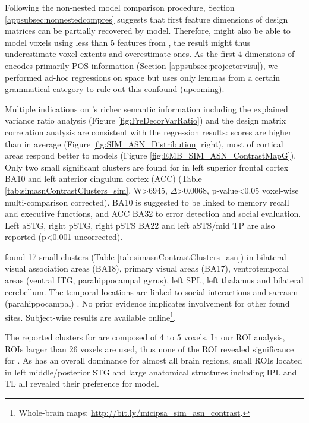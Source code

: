 Following the non-nested model comparison procedure, Section \ref{appsubsec:nonnestedcompres} suggests that first feature dimensions of  design matrices can be partially recovered by  model. Therefore,  might also be able to model voxels using less than 5 features from , the result might thus underestimate  voxel extents and overestimate  ones. As the first 4 dimensions of  encodes primarily POS information (Section \ref{appsubsec:projectorvisu}), we performed ad-hoc regressions on  space but uses only lemmas from a certain grammatical category to rule out this confound (upcoming). 

Multiple indications on 's richer semantic information including the explained variance ratio analysis (Figure \ref{fig:FreDecorVarRatio}) and the design matrix correlation analysis are consistent with the regression results:  scores are higher than  in average (Figure \ref{fig:SIM_ASN_Distribution} right), most of cortical areas respond better to  models (Figure \ref{fig:EMB_SIM_ASN_ContrastMapG}). Only two small significant clusters are found for  in left superior frontal cortex BA10 and left anterior cingulum cortex (ACC) (Table \ref{tab:simasnContrastClusters_sim}, W>6945, \(\Delta\)>0.0068, p-value<0.05 voxel-wise multi-comparison corrected). BA10 is suggested to be linked to memory recall and executive functions, and ACC BA32 to error detection and social evaluation. Left aSTG, right pSTG, right pSTS BA22 and left aSTS/mid TP are also reported (p<0.001 uncorrected). 

 found 17 small clusters  (Table \ref{tab:simasnContrastClusters_asn}) in bilateral visual association areas (BA18), primary visual areas (BA17), ventrotemporal areas (ventral ITG, parahippocampal gyrus), left SPL, left thalamus and bilateral cerebellum. The temporal locations are linked to social interactions and sarcasm (parahippocampal) \parencite{rankinDetectingSarcasmParalinguistic2009}. No prior evidence implicates \similarity involvement for other found sites. Subject-wise results are available online\footnote{Whole-brain maps: \url{http://bit.ly/micipsa_sim_asn_contrast}.}.

The reported clusters for  are composed of 4 to 5 voxels. In our ROI analysis, ROIs larger than 26 voxels are used, thus none of the ROI revealed significance for . As  has an overall dominance for almost all brain regions, small ROIs located in left middle/posterior STG and large anatomical structures including IPL and TL all revealed their preference for  model. 

